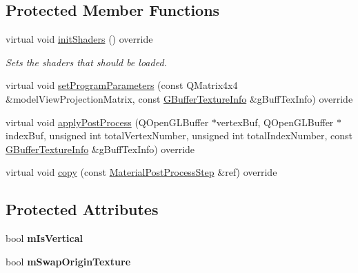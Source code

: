\subsection*{Protected Member Functions}
\begin{DoxyCompactItemize}
\item 
\mbox{\label{class_geometry_engine_1_1_custom_shading_1_1_material_blur_post_process_abd9b42b73c7c76188353eb390b33bf13}} 
virtual void \mbox{\hyperlink{class_geometry_engine_1_1_custom_shading_1_1_material_blur_post_process_abd9b42b73c7c76188353eb390b33bf13}{init\+Shaders}} () override
\begin{DoxyCompactList}\small\item\em Sets the shaders that should be loaded. \end{DoxyCompactList}\item 
virtual void \mbox{\hyperlink{class_geometry_engine_1_1_custom_shading_1_1_material_blur_post_process_a4f97b4db8405802c8330428685895fa4}{set\+Program\+Parameters}} (const Q\+Matrix4x4 \&model\+View\+Projection\+Matrix, const \mbox{\hyperlink{class_geometry_engine_1_1_g_buffer_texture_info}{G\+Buffer\+Texture\+Info}} \&g\+Buff\+Tex\+Info) override
\item 
virtual void \mbox{\hyperlink{class_geometry_engine_1_1_custom_shading_1_1_material_blur_post_process_a5a6c1101b5ea4b96601db86ea36059de}{apply\+Post\+Process}} (Q\+Open\+G\+L\+Buffer $\ast$vertex\+Buf, Q\+Open\+G\+L\+Buffer $\ast$index\+Buf, unsigned int total\+Vertex\+Number, unsigned int total\+Index\+Number, const \mbox{\hyperlink{class_geometry_engine_1_1_g_buffer_texture_info}{G\+Buffer\+Texture\+Info}} \&g\+Buff\+Tex\+Info) override
\item 
virtual void \mbox{\hyperlink{class_geometry_engine_1_1_custom_shading_1_1_material_blur_post_process_ab9890776a7a11b969f7139a6d7eba2df}{copy}} (const \mbox{\hyperlink{class_geometry_engine_1_1_custom_shading_1_1_material_post_process_step}{Material\+Post\+Process\+Step}} \&ref) override
\end{DoxyCompactItemize}
\subsection*{Protected Attributes}
\begin{DoxyCompactItemize}
\item 
\mbox{\label{class_geometry_engine_1_1_custom_shading_1_1_material_blur_post_process_a99c1938ff035151fbc7464cfe168cf74}} 
bool {\bfseries m\+Is\+Vertical}
\item 
\mbox{\label{class_geometry_engine_1_1_custom_shading_1_1_material_blur_post_process_a06a24ce359388a538f9715dd20e597ae}} 
bool {\bfseries m\+Swap\+Origin\+Texture}
\end{DoxyCompactItemize}


